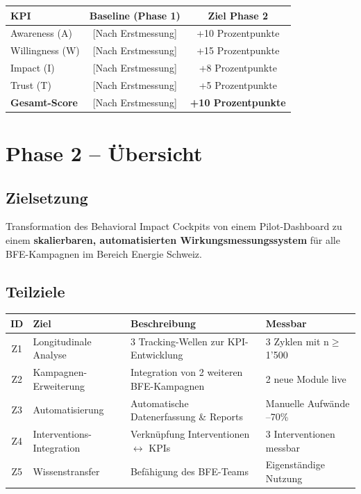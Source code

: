 \documentclass[11pt,a4paper]{article}
\begin{document}
\begin{tabular}{l c c}
\toprule
\textbf{KPI} & \textbf{Baseline (Phase 1)} & \textbf{Ziel Phase 2}\\
\midrule
\rowcolor{falightgray} Awareness (A) & [Nach Erstmessung] & +10 Prozentpunkte\\
Willingness (W) & [Nach Erstmessung] & +15 Prozentpunkte\\
\rowcolor{falightgray} Impact (I) & [Nach Erstmessung] & +8 Prozentpunkte\\
Trust (T) & [Nach Erstmessung] & +5 Prozentpunkte\\
\rowcolor{falightgray} \textbf{Gesamt-Score} & [Nach Erstmessung] & \textbf{+10 Prozentpunkte}\\
\bottomrule
\end{tabular}

\newpage

\section{Phase 2 -- Übersicht}

\subsection{Zielsetzung}

\begin{tcolorbox}[zielbox={Hauptziel Phase 2}]
Transformation des Behavioral Impact Cockpits von einem Pilot-Dashboard zu einem \textbf{skalierbaren, automatisierten Wirkungsmessungssystem} für alle BFE-Kampagnen im Bereich Energie Schweiz.
\end{tcolorbox}

\subsection{Teilziele}

\begin{tabular}{c l p{7cm} p{4cm}}
\toprule
\textbf{ID} & \textbf{Ziel} & \textbf{Beschreibung} & \textbf{Messbar}\\
\midrule
\rowcolor{falightgray} Z1 & Longitudinale Analyse & 3 Tracking-Wellen zur KPI-Entwicklung & 3 Zyklen mit n$\geq$1'500\\
Z2 & Kampagnen-Erweiterung & Integration von 2 weiteren BFE-Kampagnen & 2 neue Module live\\
\rowcolor{falightgray} Z3 & Automatisierung & Automatische Datenerfassung \& Reports & Manuelle Aufwände --70\%\\
Z4 & Interventions-Integration & Verknüpfung Interventionen $\leftrightarrow$ KPIs & 3 Interventionen messbar\\
\rowcolor{falightgray} Z5 & Wissenstransfer & Befähigung des BFE-Teams & Eigenständige Nutzung\\
\bottomrule
\end{tabular}
\end{document}
